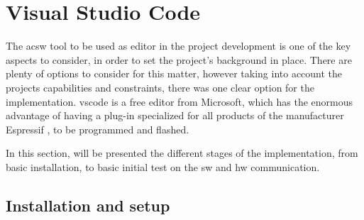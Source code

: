 %
%


\chapter{Visual Studio Code}

The ac{sw} tool to be used as editor in the project development is one of the key aspects to consider, in order to set the project's background in place. There are plenty of options to consider for this matter, however taking into account the projects capabilities and constraints, there was one clear option for the implementation. \ac{vscode} is a free editor from Microsoft, which has the enormous advantage of having a plug-in specialized for all products of the manufacturer Espressif \cite{Espressif:2022}, to be programmed and flashed.

In this section, will be presented the different stages of the implementation, from basic installation, to basic initial test on the \ac{sw} and \ac{hw} communication.


\section{Installation and setup}

